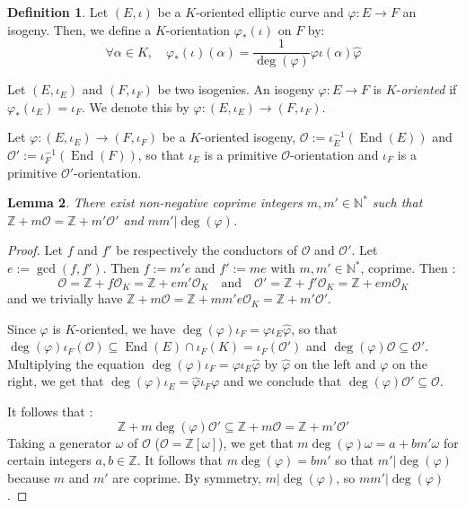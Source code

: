 \documentclass[a4paper,10pt]{report}
\theoremstyle{definition}
\newtheorem{definition}{Definition}[chapter]
\theoremstyle{plain}
\newtheorem{lemma}[definition]{Lemma}
\theoremstyle{definition}
\newcommand{\N}{\mathbb{N}}
\newcommand{\Z}{\mathbb{Z}}
\newcommand{\mO}{\mathcal{O}}
\renewcommand{\(}{\left(}
\renewcommand{\)}{\right)}
\DeclareMathOperator{\End}{End}
\begin{document}
\begin{definition}\label{definition 1}
Let $(E, \iota)$ be a $K$-oriented elliptic curve and $\varphi : E\longrightarrow F$ an isogeny.  Then,  we define a $K$-orientation $\varphi_*(\iota)$ on $F$ by:
\[\forall \alpha\in K,  \quad \varphi_*(\iota)(\alpha)=\frac{1}{\deg(\varphi)}\varphi\iota(\alpha)\widehat{\varphi}\]

Let $(E, \iota_E)$ and $(F,\iota_F)$ be two isogenies.  An isogeny $\varphi : E\longrightarrow F$ is $K$-\emph{oriented} if $\varphi_*(\iota_E)=\iota_F$.  We denote this by $\varphi : (E, \iota_E)\longrightarrow(F,\iota_F)$.
\end{definition}

Let $\varphi : (E, \iota_E)\longrightarrow(F,\iota_F)$ be a $K$-oriented isogeny,  $\mO:=\iota_E^{-1}(\End(E))$ and $\mO':=\iota_F^{-1}(\End(F))$,  so that $\iota_E$ is a primitive $\mO$-orientation and $\iota_F$ is a primitive $\mO'$-orientation.  

\begin{lemma}
There exist non-negative coprime integers $m,m'\in\N^*$ such that $\Z+m\mO=\Z+m'\mO'$ and $mm'|\deg(\varphi)$.
\end{lemma}

\begin{proof}
Let $f$ and $f'$ be respectively the conductors of $\mO$ and $\mO'$.  Let $e:=\gcd(f,f')$.  Then $f:=m'e$ and $f':=me$ with $m,m'\in\N^*$,  coprime.  Then :
\[\mO=\Z+f\mO_K=\Z+em'\mO_K \quad \mbox{and} \quad \mO'=\Z+f'\mO_K=\Z+em\mO_K\]
and we trivially have $\Z+m\mO=\Z+mm'e\mO_K=\Z+m'\mO'$.

Since $\varphi$ is $K$-oriented,  we have $\deg(\varphi)\iota_F=\varphi\iota_E\widehat{\varphi}$,  so that $\deg(\varphi)\iota_F(\mO)\subseteq \End(E)\cap\iota_F(K)=\iota_F(\mO')$ and $\deg(\varphi)\mO\subseteq \mO'$.  Multiplying the equation $\deg(\varphi)\iota_F=\varphi\iota_E\widehat{\varphi}$ by $\widehat{\varphi}$ on the left and $\varphi$ on the right, we get that $\deg(\varphi)\iota_E=\widehat{\varphi}\iota_F\varphi$ and we conclude that $\deg(\varphi)\mO'\subseteq \mO$. 

It follows that :
\[\Z+m\deg(\varphi)\mO'\subseteq \Z+m\mO= \Z+m'\mO'\]
Taking a generator $\omega$ of $\mO$ ($\mO=\Z[\omega]$),  we get that $m\deg(\varphi)\omega=a+bm'\omega$ for certain integers $a,b\in\Z$.  It follows that $m\deg(\varphi)=bm'$ so that $m'|\deg(\varphi)$ because $m$ and $m'$ are coprime.  By symmetry,  $m|\deg(\varphi)$,  so $mm'|\deg(\varphi)$.
\end{proof}
\end{document}

